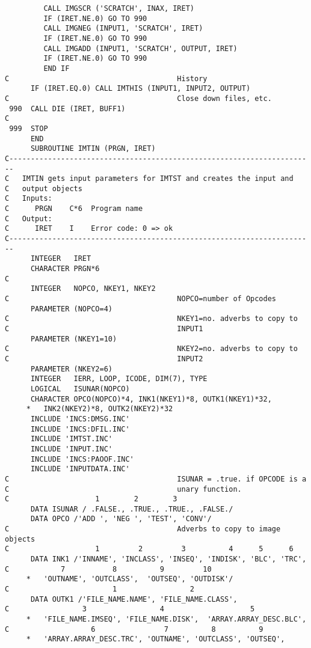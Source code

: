 {\begin{verbatim}
         CALL IMGSCR ('SCRATCH', INAX, IRET)
         IF (IRET.NE.0) GO TO 990
         CALL IMGNEG (INPUT1, 'SCRATCH', IRET)
         IF (IRET.NE.0) GO TO 990
         CALL IMGADD (INPUT1, 'SCRATCH', OUTPUT, IRET)
         IF (IRET.NE.0) GO TO 990
         END IF
C                                       History
      IF (IRET.EQ.0) CALL IMTHIS (INPUT1, INPUT2, OUTPUT)
C                                       Close down files, etc.
 990  CALL DIE (IRET, BUFF1)
C
 999  STOP
      END
      SUBROUTINE IMTIN (PRGN, IRET)
C-----------------------------------------------------------------------
C   IMTIN gets input parameters for IMTST and creates the input and
C   output objects
C   Inputs:
C      PRGN    C*6  Program name
C   Output:
C      IRET    I    Error code: 0 => ok
C-----------------------------------------------------------------------
      INTEGER   IRET
      CHARACTER PRGN*6
C
      INTEGER   NOPCO, NKEY1, NKEY2
C                                       NOPCO=number of Opcodes
      PARAMETER (NOPCO=4)
C                                       NKEY1=no. adverbs to copy to
C                                       INPUT1
      PARAMETER (NKEY1=10)
C                                       NKEY2=no. adverbs to copy to
C                                       INPUT2
      PARAMETER (NKEY2=6)
      INTEGER   IERR, LOOP, ICODE, DIM(7), TYPE
      LOGICAL   ISUNAR(NOPCO)
      CHARACTER OPCO(NOPCO)*4, INK1(NKEY1)*8, OUTK1(NKEY1)*32,
     *   INK2(NKEY2)*8, OUTK2(NKEY2)*32
      INCLUDE 'INCS:DMSG.INC'
      INCLUDE 'INCS:DFIL.INC'
      INCLUDE 'IMTST.INC'
      INCLUDE 'INPUT.INC'
      INCLUDE 'INCS:PAOOF.INC'
      INCLUDE 'INPUTDATA.INC'
C                                       ISUNAR = .true. if OPCODE is a
C                                       unary function.
C                    1        2        3
      DATA ISUNAR / .FALSE., .TRUE., .TRUE., .FALSE./
      DATA OPCO /'ADD ', 'NEG ', 'TEST', 'CONV'/
C                                       Adverbs to copy to image objects
C                    1         2         3          4      5      6
      DATA INK1 /'INNAME', 'INCLASS', 'INSEQ', 'INDISK', 'BLC', 'TRC',
C            7           8          9         10
     *   'OUTNAME', 'OUTCLASS',  'OUTSEQ', 'OUTDISK'/
C                        1                 2
      DATA OUTK1 /'FILE_NAME.NAME', 'FILE_NAME.CLASS',
C                 3                 4                    5
     *   'FILE_NAME.IMSEQ', 'FILE_NAME.DISK',  'ARRAY.ARRAY_DESC.BLC',
C                   6                7          8          9
     *   'ARRAY.ARRAY_DESC.TRC', 'OUTNAME', 'OUTCLASS', 'OUTSEQ',

\end{verbatim}}

